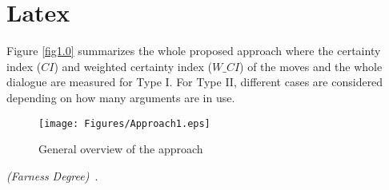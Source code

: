 \documentclass{article}
\begin{document}
\section{Latex}

Figure \ref{fig1.0} summarizes the whole proposed approach where the certainty index ($CI$) and weighted certainty index ($W\_CI$) of the moves and the whole dialogue are
measured for Type I. For Type II, different cases are considered depending on how many arguments are in use.

\begin{figure}[t]
                \begin{center}
                \texttt{[image: Figures/Approach1.eps]}
                \end{center}
                \caption{General overview of the approach}\label{fig1.0}
                \label{Stack}
                \end{figure}


 \emph{(Farness Degree)}~\cite{Marey09}.




\end{document}
